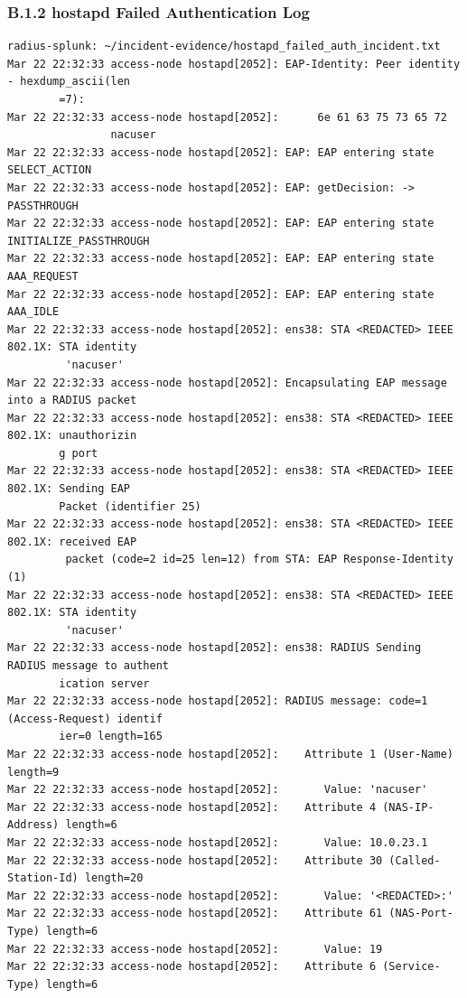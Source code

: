\documentclass[11pt]{article}
\begin{document}
\subsubsection{B.1.2 hostapd Failed Authentication Log}
\label{sec:appendix-b-hostapd-failed-auth-incident-log}

\begin{verbatim}
radius-splunk: ~/incident-evidence/hostapd_failed_auth_incident.txt
Mar 22 22:32:33 access-node hostapd[2052]: EAP-Identity: Peer identity - hexdump_ascii(len
        =7):
Mar 22 22:32:33 access-node hostapd[2052]:      6e 61 63 75 73 65 72                      
                nacuser
Mar 22 22:32:33 access-node hostapd[2052]: EAP: EAP entering state SELECT_ACTION
Mar 22 22:32:33 access-node hostapd[2052]: EAP: getDecision: -> PASSTHROUGH
Mar 22 22:32:33 access-node hostapd[2052]: EAP: EAP entering state INITIALIZE_PASSTHROUGH
Mar 22 22:32:33 access-node hostapd[2052]: EAP: EAP entering state AAA_REQUEST
Mar 22 22:32:33 access-node hostapd[2052]: EAP: EAP entering state AAA_IDLE
Mar 22 22:32:33 access-node hostapd[2052]: ens38: STA <REDACTED> IEEE 802.1X: STA identity
         'nacuser'
Mar 22 22:32:33 access-node hostapd[2052]: Encapsulating EAP message into a RADIUS packet
Mar 22 22:32:33 access-node hostapd[2052]: ens38: STA <REDACTED> IEEE 802.1X: unauthorizin
        g port
Mar 22 22:32:33 access-node hostapd[2052]: ens38: STA <REDACTED> IEEE 802.1X: Sending EAP 
        Packet (identifier 25)
Mar 22 22:32:33 access-node hostapd[2052]: ens38: STA <REDACTED> IEEE 802.1X: received EAP
         packet (code=2 id=25 len=12) from STA: EAP Response-Identity (1)
Mar 22 22:32:33 access-node hostapd[2052]: ens38: STA <REDACTED> IEEE 802.1X: STA identity
         'nacuser'
Mar 22 22:32:33 access-node hostapd[2052]: ens38: RADIUS Sending RADIUS message to authent
        ication server
Mar 22 22:32:33 access-node hostapd[2052]: RADIUS message: code=1 (Access-Request) identif
        ier=0 length=165
Mar 22 22:32:33 access-node hostapd[2052]:    Attribute 1 (User-Name) length=9
Mar 22 22:32:33 access-node hostapd[2052]:       Value: 'nacuser'
Mar 22 22:32:33 access-node hostapd[2052]:    Attribute 4 (NAS-IP-Address) length=6
Mar 22 22:32:33 access-node hostapd[2052]:       Value: 10.0.23.1
Mar 22 22:32:33 access-node hostapd[2052]:    Attribute 30 (Called-Station-Id) length=20
Mar 22 22:32:33 access-node hostapd[2052]:       Value: '<REDACTED>:'
Mar 22 22:32:33 access-node hostapd[2052]:    Attribute 61 (NAS-Port-Type) length=6
Mar 22 22:32:33 access-node hostapd[2052]:       Value: 19
Mar 22 22:32:33 access-node hostapd[2052]:    Attribute 6 (Service-Type) length=6

\end{verbatim}
\end{document}
